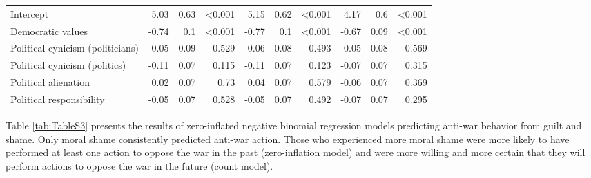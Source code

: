 \documentclass[
]{article}
\begin{document}
\begin{table}[H]
\begin{tabular}[t]{lrrrrrrrrr}
\midrule
Intercept & 5.03 & 0.63 & <0.001 & 5.15 & 0.62 & <0.001 & 4.17 & 0.6 & <0.001\\
Democratic values & -0.74 & 0.1 & <0.001 & -0.77 & 0.1 & <0.001 & -0.67 & 0.09 & <0.001\\
\addlinespace
Political cynicism (politicians) & -0.05 & 0.09 & 0.529 & -0.06 & 0.08 & 0.493 & 0.05 & 0.08 & 0.569\\
Political cynicism (politics) & -0.11 & 0.07 & 0.115 & -0.11 & 0.07 & 0.123 & -0.07 & 0.07 & 0.315\\
Political alienation & 0.02 & 0.07 & 0.73 & 0.04 & 0.07 & 0.579 & -0.06 & 0.07 & 0.369\\
Political responsibility & -0.05 & 0.07 & 0.528 & -0.05 & 0.07 & 0.492 & -0.07 & 0.07 & 0.295\\
\bottomrule
\end{tabular}
\end{table}

Table \ref{tab:TableS3} presents the results of zero-inflated negative binomial regression models predicting anti-war behavior from guilt and shame. Only moral shame consistently predicted anti-war action. Those who experienced more moral shame were more likely to have performed at least one action to oppose the war in the past (zero-inflation model) and were more willing and more certain that they will perform actions to oppose the war in the future (count model).
\end{document}
